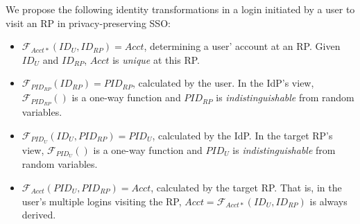 We propose the following identity transformations in a login initiated by a user to visit an RP in privacy-preserving SSO:
\vspace{-\topsep}
\begin{itemize}
\setlength{\topsep}{0pt}
\setlength{\partopsep}{0pt}
\setlength{\itemsep}{0pt}
\setlength{\parsep}{0pt}
\setlength{\parskip}{0pt}
\item
$\mathcal{F}_{Acct\ast}(ID_{U}, ID_{RP}) = Acct$, determining a user' account at an RP.
Given $ID_U$ and $ID_{RP}$, $Acct$ is %
\emph{unique} at this RP.

\item
$\mathcal{F}_{PID_{RP}}(ID_{RP}) = PID_{RP}$, calculated by the user.
In the IdP's view,
$\mathcal{F}_{PID_{RP}}()$ is a one-way function and $PID_{RP}$
is \emph{indistinguishable} from random variables.
\item
$\mathcal{F}_{PID_U}(ID_U, PID_{RP}) = PID_{U}$, calculated by the IdP.
In the target RP's view,
    $\mathcal{F}_{PID_U}()$ is a one-way function and $PID_{U}$ is \emph{indistinguishable} from random variables.
\item
$\mathcal{F}_{Acct}(PID_{U}, PID_{RP}) = Acct$, calculated by the target RP.
That is, in the user's multiple logins visiting the RP,
    $Acct = \mathcal{F}_{Acct\ast}(ID_{U}, ID_{RP})$ is always derived.
\end{itemize}



